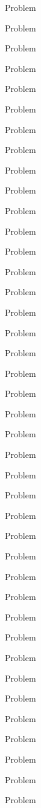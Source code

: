 \documentclass[twoside]{article}
\begin{document}
\begin{probbox}[ForestGreen]
\item Problem
\item Problem
\item Problem
\item Problem
\item Problem
\item Problem
\item Problem
\item Problem
\item Problem
\item Problem
\item Problem
\item Problem
\end{probbox}

\begin{probbox}
\item Problem
\item Problem
\item Problem
\item Problem
\item Problem
\item Problem
\item Problem
\item Problem
\item Problem
\item Problem
\item Problem
\item Problem
\end{probbox}

\begin{testbox}
\item Problem
\item Problem
\item Problem
\item Problem
\item Problem
\item Problem
\item Problem
\item Problem
\end{testbox}

\begin{testbox}[Test ]
\item Problem
\item Problem
\item Problem
\item Problem
\item Problem
\item Problem
\item Problem
\item Problem
\end{testbox}
\end{document}
